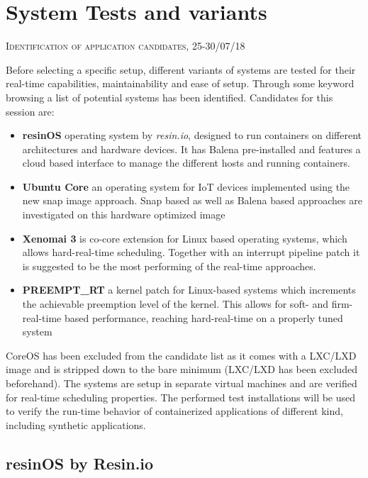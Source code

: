 \documentclass[]{scrartcl}
\begin{document}
\section{System Tests and variants}

{\small\textsc{Identification of application candidates, 25-30/07/18} \bigskip}

Before selecting a specific setup, different variants of systems are tested for their real-time capabilities, maintainability and ease of setup.
Through some keyword browsing a list of potential systems has been identified.
Candidates for this session are:

\begin{itemize}
	\item \textbf{resinOS} operating system by \textit{resin.io}, designed to run containers on different architectures and hardware devices. It has Balena pre-installed and features a cloud based interface to manage the different hosts and running containers.
	\item \textbf{Ubuntu Core} an operating system for IoT devices implemented using the new snap image approach. Snap based as well as Balena based approaches are investigated on this hardware optimized image
	\item \textbf{Xenomai 3} is co-core extension for Linux based operating systems, which allows hard-real-time scheduling. Together with an interrupt pipeline patch it is suggested to be the most performing of the real-time approaches.
	\item \textbf{PREEMPT\_RT} a kernel patch for Linux-based systems which increments the achievable preemption level of the kernel. This allows for soft- and firm-real-time based performance, reaching hard-real-time on a properly tuned system
\end{itemize}

CoreOS has been excluded from the candidate list as it comes with a LXC/LXD image and is stripped down to the bare minimum (LXC/LXD has been excluded beforehand).
The systems are setup in separate virtual machines and are verified for real-time scheduling properties. The performed test  installations will be used to verify the run-time behavior of containerized applications of different kind, including synthetic applications.

\subsection{resinOS by Resin.io}
\end{document}
